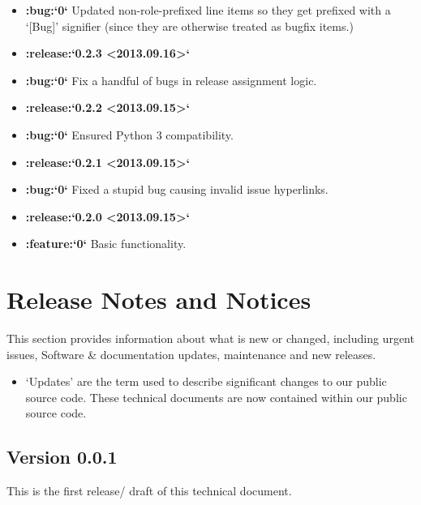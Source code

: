 \documentclass[letterpaper,10pt,english]{sphinxmanual}
\begin{document}
\begin{itemize}
\item {} 
{\color{red}\bfseries{}:bug:{}`0{}`} Updated non-role-prefixed line items so they get prefixed with a
‘{[}Bug{]}’ signifier (since they are otherwise treated as bugfix items.)

\item {} 
{\color{red}\bfseries{}:release:{}`0.2.3 \textless{}2013.09.16\textgreater{}{}`}

\item {} 
{\color{red}\bfseries{}:bug:{}`0{}`} Fix a handful of bugs in release assignment logic.

\item {} 
{\color{red}\bfseries{}:release:{}`0.2.2 \textless{}2013.09.15\textgreater{}{}`}

\item {} 
{\color{red}\bfseries{}:bug:{}`0{}`} Ensured Python 3 compatibility.

\item {} 
{\color{red}\bfseries{}:release:{}`0.2.1 \textless{}2013.09.15\textgreater{}{}`}

\item {} 
{\color{red}\bfseries{}:bug:{}`0{}`} Fixed a stupid bug causing invalid issue hyperlinks.

\item {} 
{\color{red}\bfseries{}:release:{}`0.2.0 \textless{}2013.09.15\textgreater{}{}`}

\item {} 
{\color{red}\bfseries{}:feature:{}`0{}`} Basic functionality.

\end{itemize}


\chapter{Release Notes and Notices}
\label{\detokenize{releasenotes:release-notes-and-notices}}\label{\detokenize{releasenotes::doc}}
This section provides information about what is new or changed, including urgent issues, Software \& documentation updates, maintenance and new releases.
\begin{itemize}
\item {} 
‘Updates’ are the term used to describe significant changes to our public source code. These technical documents are now contained within our public source code.

\end{itemize}


\section{Version 0.0.1}
\label{\detokenize{releasenotes:version-0-0-1}}
This is the first release/ draft of this technical document.
\end{document}
